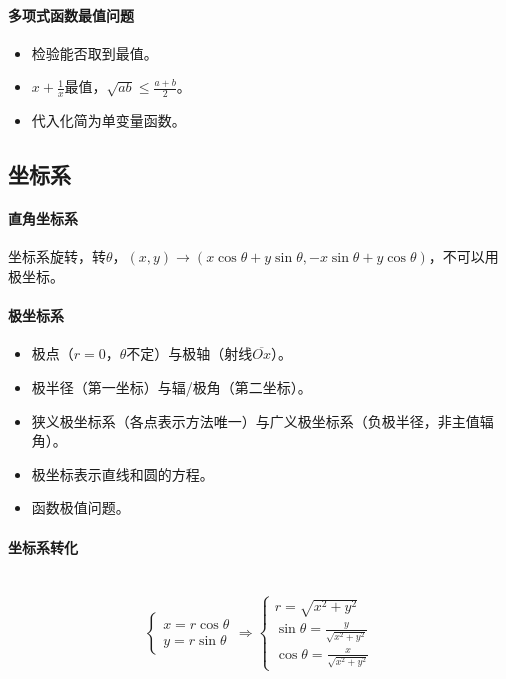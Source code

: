\documentclass[
12pt, %
a4paper, 
oneside, %
headinclude,footinclude, %
]{scrartcl}
\begin{document}
\paragraph{多项式函数最值问题}
\begin{itemize}
\item 检验能否取到最值。
\item $ x + \frac{1}{x} $最值，$ \sqrt{ab}\leq \frac{a + b}{2}$。
\item 代入化简为单变量函数。
\end{itemize}
\subsection[坐标系]{坐标系}
\paragraph{直角坐标系}
坐标系旋转，转$ \theta $，$ (x, y) \to (x\cos\theta + y\sin\theta, -x\sin\theta + y\cos\theta) $，不可以用极坐标。
\paragraph{极坐标系}
\begin{itemize}
\item 极点（$ r = 0 $，$ \theta $不定）与极轴（射线$ \overline{Ox} $）。
\item 极半径（第一坐标）与辐/极角（第二坐标）。
\item 狭义极坐标系（各点表示方法唯一）与广义极坐标系（负极半径，非主值辐角）。
\item 极坐标表示直线和圆的方程。
\item 函数极值问题。
\end{itemize}
\paragraph{坐标系转化}~\\
$$
\begin{cases}
x = r\cos\theta \\
y = r\sin\theta
\end{cases}
\Longrightarrow
\begin{cases}
r = \sqrt{x^2 + y^2} \\
\sin\theta = \frac{y}{\sqrt{x^2 + y^2}} \\
\cos\theta = \frac{x}{\sqrt{x^2 + y^2}}
\end{cases}
$$
\end{document}
